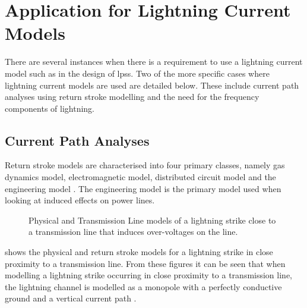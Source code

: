 
\section{Application for Lightning Current Models}
\label{sec:background_applications}
There are several instances when there is a requirement to use a lightning current model such as in the design of \glspl{lps}. Two of the more specific cases where lightning current models are used are detailed below. These include current path analyses using return stroke modelling and the need for the frequency components of lightning.
\subsection{Current Path Analyses}
\label{sub:background_lemp}
Return stroke models are characterised into four primary classes, namely gas dynamics model, electromagnetic model, distributed circuit model and the engineering model \cite{Paolone2009,Rakov2003,Rakov2009}. The engineering model is the primary model used when looking at induced effects on power lines.

\begin{figure}[htbp]
    \centering
    \caption{ Physical and  Transmission Line models of a lightning strike close to a transmission line that induces over-voltages on the line.}
    \label{fig:induced_voltage_models}
\end{figure}
 shows the  physical and  return stroke models for a lightning strike in close proximity to a transmission line. From these figures it can be seen that when modelling a lightning strike occurring in close proximity to a transmission line, the lightning channel is modelled as a monopole with a perfectly conductive ground and a vertical current path \cite{Paolone2009,Baba2007,McAfee2015}.

